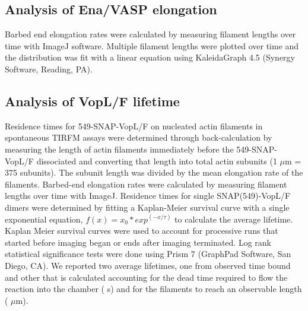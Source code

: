 \subsection{Analysis of Ena/VASP elongation}
Barbed end elongation rates were calculated by measuring filament lengths over time with ImageJ software. Multiple filament lengths were plotted over time and the distribution was fit with a linear equation using KaleidaGraph 4.5 (Synergy Software, Reading, PA).

\subsection{Analysis of VopL/F lifetime}
Residence times for 549-SNAP-VopL/F on nucleated actin filaments in spontaneous TIRFM assays were determined through back-calculation by measuring the length of actin filaments immediately before the 549-SNAP-VopL/F dissociated and converting that length into total actin subunits (1 $\mu$m = 375 subunits). The subunit length was divided by the mean elongation rate of the filaments. Barbed-end elongation rates were calculated by measuring filament lengths over time with ImageJ. Residence times for single SNAP(549)-VopL/F dimers were determined by fitting a Kaplan-Meier \citep{kaplan_nonparametric_1958} survival curve with a single exponential equation, $f(x) = x_{0} * exp^{(-x/\tau)}$ to calculate the average lifetime. Kaplan Meier survival curves were used to account for processive runs that started before imaging began or ends after imaging terminated. Log rank statistical significance tests were done using Prism 7 (GraphPad Software, San Diego, CA). We reported two average lifetimes, one from observed time bound and other that is calculated accounting for the dead time required to flow the reaction into the chamber ( s) and for the filaments to reach an observable length ( $\mu$m).


